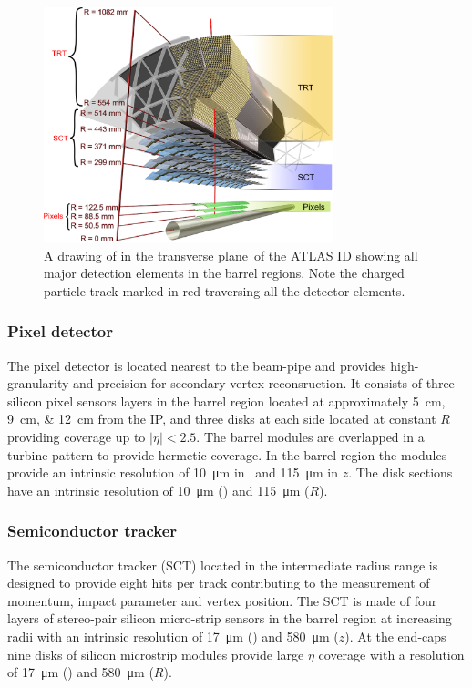 \begin{figure}[htbp]
  \centering
  \includegraphics[width=0.75\textwidth]{PartDetector/Diagrams/ID_3D_Overview.eps}
  \caption{A drawing of in the transverse plane of the ATLAS ID showing all major detection elements in the barrel regions. Note the charged particle track marked in red traversing all the detector elements.}
  \label{fig:DetectorIDTransverse}
\end{figure}

\subsubsection{Pixel detector}
The pixel detector is located nearest to the beam-pipe and provides high-granularity and precision for secondary vertex reconsruction. It consists of three silicon pixel sensors layers in the barrel region located at approximately \SIlist{5;9;12}{\cm} from the IP, and three disks at each side located at constant $R$ providing coverage up to $|\eta|<2.5$. The barrel modules are overlapped in a turbine pattern to provide hermetic coverage. In the barrel region the modules provide an intrinsic resolution of \SI{10}{\um} in \rphi\ and \SI{115}{\um} in $z$. The disk sections have an intrinsic resolution of \SI{10}{\um} (\rphi) and \SI{115}{\um} ($R$).

\subsubsection{Semiconductor tracker}
The semiconductor tracker (SCT) located in the intermediate radius range is designed to provide eight hits per track contributing to the measurement of momentum, impact parameter and vertex position. The SCT is made of four layers of stereo-pair silicon micro-strip sensors in the barrel region at increasing radii with an intrinsic resolution of \SI{17}{\um} (\rphi) and \SI{580}{\um} ($z$). At the end-caps nine disks of silicon microstrip modules provide large $\eta$ coverage with a resolution of \SI{17}{\um} (\rphi) and \SI{580}{\um} ($R$).

